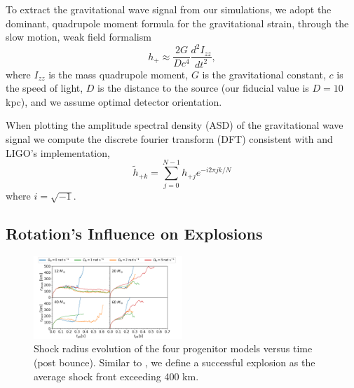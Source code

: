 \documentclass[twocolumn,times]{aastex62}  %
\begin{document}
To extract the gravitational wave signal from our simulations, we adopt the dominant, quadrupole moment formula for the gravitational strain, through the slow motion, weak field formalism %
\citep[eg.][]{finn:1990,blanchet:1990}
\begin{equation}
    h_+ \approx \frac{2G}{Dc^4}
    \frac{d^2I_{zz}}{dt^2},
\label{eq:quad}
\end{equation}
where $I_{zz}$ is the mass quadrupole moment, $G$ is the gravitational constant, $c$ is the speed of light, $D$ is the distance to the source (our fiducial value is $D=10$ kpc), and we assume optimal detector orientation.\\
\par When plotting the amplitude spectral density (ASD) of the gravitational wave signal we compute the discrete fourier transform (DFT) consistent with \citet{anderson:2004} and LIGO's implementation,
\begin{equation}
\widetilde{h}_{+k} = \sum^{N-1}_{j=0} h_{+j} e^{-i2\pi jk/N}
\label{eq:dft}
\end{equation}
where $i=\sqrt{-1}$.

\subsection{Rotation's Influence on Explosions}

\begin{figure}[t]
    \centering
    \includegraphics[width = 0.5\textwidth]{figures/M1_shock_mass_top_legend.pdf}
    \caption{Shock radius evolution of the four  progenitor models versus time (post bounce).  Similar to \citet{couch:2013b}, we define a successful explosion as the average shock front exceeding 400 km. }
    \label{fig:shock}
\end{figure} 
\end{document}
